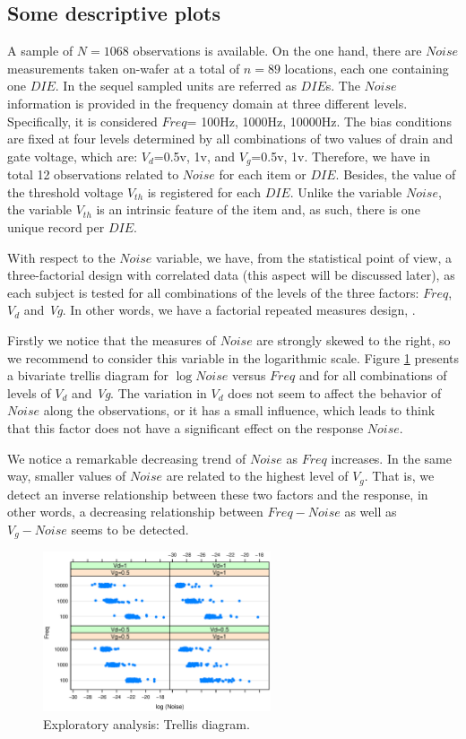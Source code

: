\documentclass[sn-mathphys]{sn-jnl}%
\theoremstyle{thmstyleone}%
\theoremstyle{thmstyletwo}%
\theoremstyle{thmstylethree}%
\begin{document}
\subsection{Some descriptive plots}
A sample of $N = 1068$ observations is available. On the one hand, there are $Noise$ measurements taken on-wafer at a total of $n=89$ locations, each one containing one  $DIE$. In the sequel sampled units are referred as $DIE$s. The $Noise$ information is provided in the frequency domain at three different levels. Specifically, it is considered $Freq$= 100Hz, 1000Hz, 10000Hz. The bias conditions are fixed at four levels determined by all combinations of two values of drain and gate voltage, which are: $V_d$=0.5v, 1v, and $V_g$=0.5v, 1v. Therefore, we have in total 12 observations related to $Noise$ for each item or $DIE$. Besides, the value of  the threshold voltage $V_{th}$ is registered for each $DIE$. Unlike the variable $Noise$, the variable $V_{th}$ is an intrinsic feature of the item and, as such, there is one unique record per $DIE$.

With respect to the $Noise$ variable, we have, from the statistical point of view, a three-factorial design with correlated data (this aspect will be discussed later), as each subject is tested for all combinations of the levels of the three factors: $Freq$, $V_d$ and {\it Vg}. In other words, we have a factorial repeated measures design, \cite{BHN2000}.

Firstly we notice that the measures of  $Noise$ are strongly skewed to the right, so we recommend to consider this variable in the logarithmic scale. Figure \ref{fig:trellis2} presents a bivariate trellis diagram for $\log Noise$ versus $Freq$ and for all combinations of levels of $V_d$ and {\it Vg}. The variation in $V_d$ does not seem to affect the behavior of $Noise$ along the observations, or it has a small influence, which leads to think that this factor does not have a significant effect on the response $Noise$.  

We notice a remarkable decreasing trend of $Noise$ as $Freq$ increases. In the same way, smaller values of $Noise$ are related to the highest level of $V_g$. That is, we detect an inverse relationship between these two factors and the response, in other words, a decreasing relationship between $Freq-Noise$ as well as $V_g-Noise$ seems to be detected. 
\begin{figure}[ht]
	\centerline{
		\includegraphics[width=0.6\textwidth]{Fig2_trellis2.eps}}
	\caption{Exploratory analysis: Trellis diagram. }
	\label{fig:trellis2}
\end{figure}
\end{document}
